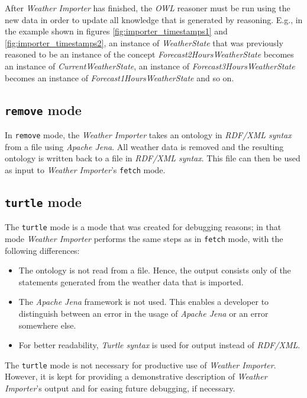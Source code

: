 After \emph{Weather Importer} has finished, the \emph{OWL} reasoner must be run using the new data in order to update all knowledge that is generated by reasoning. E.g., in the example shown in figures \ref{fig:importer_timestamps1} and \ref{fig:importer_timestamps2}, an instance of \emph{WeatherState} that was previously reasoned to be an instance of the concept \emph{Forecast2HoursWeatherState} becomes an instance of \emph{CurrentWeatherState}, an instance of \emph{Forecast3HoursWeatherState} becomes an instance of \emph{Forecast1HoursWeatherState} and so on.

\subsection{\texttt{remove} mode}

In \texttt{remove} mode, the \emph{Weather Importer} takes an ontology in \emph{RDF/XML syntax} from a file using \emph{Apache Jena}. All weather data is removed and the resulting ontology is written back to a file in \emph{RDF/XML syntax}. This file can then be used as input to \emph{Weather Importer}'s \texttt{fetch} mode.

\subsection{\texttt{turtle} mode}
\label{subsec:importer_turtle}

The \texttt{turtle} mode is a mode that was created for debugging reasons; in that mode \emph{Weather Importer} performs the same steps as in \texttt{fetch} mode, with the following differences:
\begin{itemize}
  \item The \thinkhomeweather ontology is not read from a file. Hence, the output consists only of the statements generated from the weather data that is imported.
  \item The \emph{Apache Jena} framework is not used. This enables a developer to distinguish between an error in the usage of \emph{Apache Jena} or an error somewhere else.
  \item For better readability, \emph{Turtle syntax} is used for output instead of \emph{RDF/XML}.
\end{itemize}

The \texttt{turtle} mode is not necessary for productive use of \emph{Weather Importer}. However, it is kept for providing a demonstrative description of \emph{Weather Importer}'s output and for easing future debugging, if necessary.

